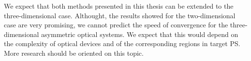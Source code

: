 
We expect that both methods presented in this thesis can be extended to the three-dimensional case. Althought, the results showed for the two-dimensional case are very promising, we cannot predict the speed of convergence for the three-dimensional asymmetric optical systems. We expect that this would depend on the complexity of optical devices and of the corresponding regions in target PS. More research should be oriented on this topic.
